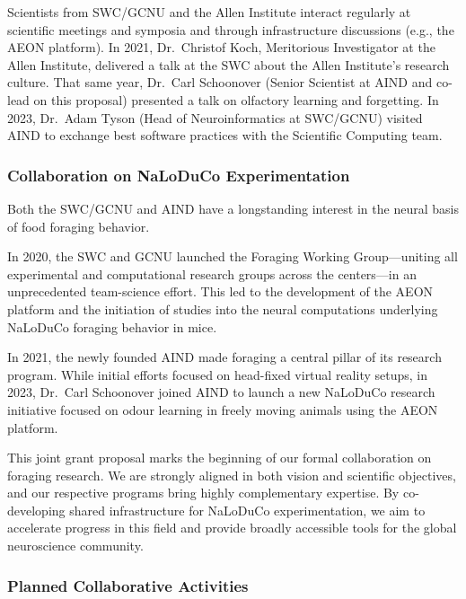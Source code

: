 \begin{description}
Scientists from SWC/GCNU and the Allen Institute interact regularly at
        scientific meetings and symposia and through infrastructure discussions
        (e.g., the AEON platform). In 2021, Dr.~Christof Koch, Meritorious
        Investigator at the Allen Institute, delivered a talk at the SWC about
        the Allen Institute’s research culture. That same year, Dr.~Carl
        Schoonover (Senior Scientist at AIND and co-lead on this proposal)
        presented a talk on olfactory learning and forgetting. In 2023,
        Dr.~Adam Tyson (Head of Neuroinformatics at SWC/GCNU) visited AIND to
        exchange best software practices with the Scientific Computing team.

\end{description}

\subsubsection*{Collaboration on NaLoDuCo Experimentation}

Both the SWC/GCNU and AIND have a longstanding interest in the neural basis of food foraging behavior.

In 2020, the SWC and GCNU launched the Foraging Working Group—uniting all experimental and computational research groups across the centers—in an unprecedented team-science effort. This led to the development of the AEON platform and the initiation of studies into the neural computations underlying NaLoDuCo foraging behavior in mice.

In 2021, the newly founded AIND made foraging a central pillar of its research
program. While initial efforts focused on head-fixed virtual reality setups, in
2023, Dr.~Carl Schoonover joined AIND to launch a new NaLoDuCo research
initiative focused on odour learning in freely moving animals using the AEON platform.

This joint grant proposal marks the beginning of our formal collaboration on
foraging research. We are strongly aligned in both vision and scientific
objectives, and our respective programs bring highly complementary expertise.
By co-developing shared infrastructure for NaLoDuCo experimentation, we aim to
accelerate progress in this field and provide broadly accessible tools for the
global neuroscience community.

\subsubsection*{Planned Collaborative Activities}

